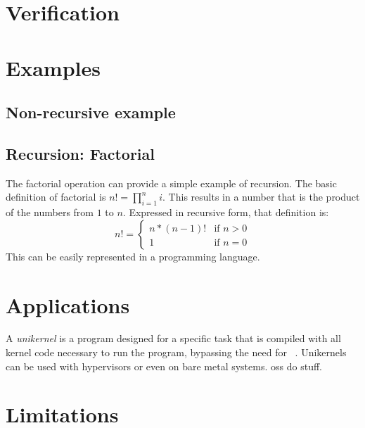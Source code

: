 
\section{Verification}\label{se:cfg_verification}

\section{Examples}\label{se:cfg_examples}
\subsection{Non-recursive example}

\subsection{Recursion: Factorial}
The factorial operation can provide a simple example of recursion.
The basic definition of factorial is $n!=\prod_{i=1}^n i$.%
This results in a number that is the product of the numbers from $1$ to $n$.
Expressed in recursive form, that definition is:
\begin{equation}
  n!=\begin{cases}
    n * (n - 1)! & \text{if }n > 0 \\
    1 & \text{if }n = 0
  \end{cases}
\end{equation}
This can be easily represented in a programming language. %

\section{Applications}\label{se:cfg_applications}
A \emph{unikernel} is a program designed for a specific task
that is compiled with all kernel code necessary to run the program,
bypassing the need for ~\citep{madhavapeddy2014unikernels}.
Unikernels can be used with hypervisors or even on bare metal systems.
\Acp{os} do stuff.

\section{Limitations}
